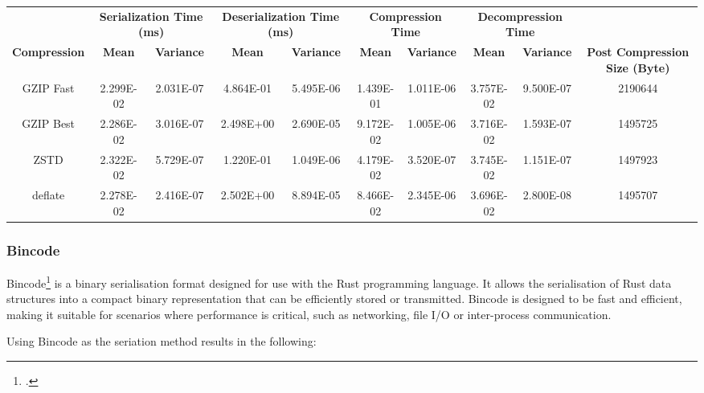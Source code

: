 \begin{table}[H]
\centering
\begin{tabular}{cccccccccc}
\hline
 &
  \multicolumn{2}{c}{\textbf{Serialization Time (ms)}} &
  \multicolumn{2}{c}{\textbf{Deserialization Time (ms)}} &
  \multicolumn{2}{c}{\textbf{Compression Time}} &
  \multicolumn{2}{c}{\textbf{Decompression Time}} &
   \\
\textbf{Compression} & \textbf{Mean}     & \textbf{Variance} & \textbf{Mean}     & \textbf{Variance} & \textbf{Mean}     & \textbf{Variance} & \textbf{Mean}     & \textbf{Variance} & \textbf{Post Compression Size (Byte)} \\
\hline
GZIP Fast           & 2.299E-02 & 2.031E-07 & 4.864E-01 & 5.495E-06 & 1.439E-01 & 1.011E-06 & 3.757E-02 & 9.500E-07 & 2190644 \\
GZIP Best           & 2.286E-02 & 3.016E-07 & 2.498E+00 & 2.690E-05 & 9.172E-02 & 1.005E-06 & 3.716E-02 & 1.593E-07 & 1495725 \\
ZSTD                & 2.322E-02 & 5.729E-07 & 1.220E-01 & 1.049E-06 & 4.179E-02 & 3.520E-07 & 3.745E-02 & 1.151E-07 & 1497923 \\
deflate             & 2.278E-02 & 2.416E-07 & 2.502E+00 & 8.894E-05 & 8.466E-02 & 2.345E-06 & 3.696E-02 & 2.800E-08 & 1495707 \\
\hline
\end{tabular}
\end{table}

\subsubsection{Bincode}
Bincode\footcite{bincode} is a binary serialisation format designed for use with the Rust programming language. It allows the serialisation of Rust data structures into a compact binary representation that can be efficiently stored or transmitted. Bincode is designed to be fast and efficient, making it suitable for scenarios where performance is critical, such as networking, file I/O or inter-process communication.

Using Bincode as the seriation method results in the following:

